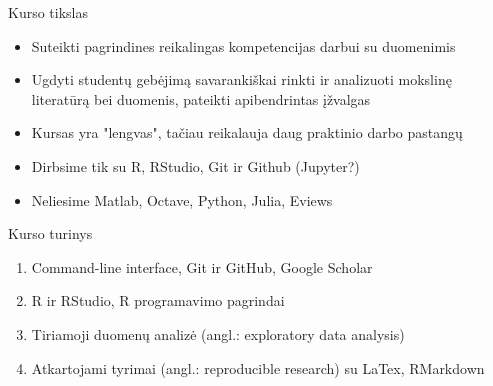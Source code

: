 \documentclass[11pt,xcolor=table]{beamer}
\begin{document}


\begin{frame}{Kurso tikslas}
\begin{itemize}
\item Suteikti pagrindines reikalingas kompetencijas darbui su duomenimis
\item Ugdyti studentų gebėjimą savarankiškai rinkti ir analizuoti mokslinę literatūrą bei duomenis, pateikti apibendrintas įžvalgas
\item Kursas yra "lengvas", tačiau reikalauja daug praktinio darbo pastangų
\item Dirbsime tik su R, RStudio, Git ir Github (Jupyter?)
\item Neliesime Matlab, Octave, Python, Julia, Eviews
\end{itemize}
\end{frame}



\begin{frame}{Kurso turinys}
\begin{enumerate}
\item Command-line interface,  Git ir GitHub, Google Scholar
\item R ir RStudio, R programavimo pagrindai
\item Tiriamoji duomenų analizė (angl.: exploratory data analysis)
\item Atkartojami tyrimai (angl.: reproducible research) su LaTex, RMarkdown
\end{enumerate}
\end{frame}
\end{document}
